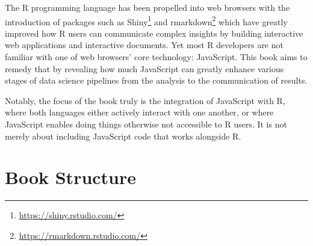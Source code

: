 \documentclass[10pt,]{krantz}
\renewcommand{\href}[2]{#2\footnote{\url{#1}}}
\begin{document}
The R programming language has been propelled into web browsers with the introduction of packages such as \href{https://shiny.rstudio.com/}{Shiny} \citep{R-shiny} and \href{https://rmarkdown.rstudio.com/}{rmarkdown} \citep{R-rmarkdown} which have greatly improved how R users can communicate complex insights by building interactive web applications and interactive documents. Yet most R developers are not familiar with one of web browsers' core technology: JavaScript. This book aims to remedy that by revealing how much JavaScript can greatly enhance various stages of data science pipelines from the analysis to the communication of results.

Notably, the focus of the book truly is the integration of JavaScript with R, where both languages either actively interact with one another, or where JavaScript enables doing things otherwise not accessible to R users. It is not merely about including JavaScript code that works alongside R.

\hypertarget{book-structure}{%
\section*{Book Structure}\label{book-structure}}
\end{document}
